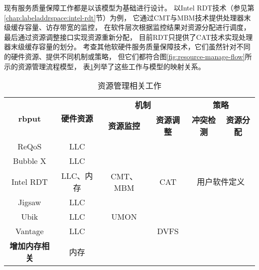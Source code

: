 
现有服务质量保障工作都是以该模型为基础进行设计。
以Intel RDT技术（参见第\ref{chap:labeladdrspace:intel-rdt}节）为例，
它通过CMT与MBM技术提供处理器末级缓存容量、访存带宽的监控，
在软件层次根据监控结果对资源分配进行调度，
最后通过资源调整接口实现资源重新分配，
目前RDT只提供了CAT技术实现处理器末级缓存容量的划分。
考查其他软硬件服务质量保障技术\cite{}，它们虽然针对不同的硬件资源、提供不同机制或策略，
但它们都符合图\ref{fig:resource-manage-flow}所示的资源管理流程模型，
表\ref{tab:resman-compare}列举了这些工作与模型的映射关系。


\begin{table}[htb]
  \centering
  \begin{minipage}[t]{0.95\linewidth}
  \caption{资源管理相关工作}
  \label{tab:resman-compare}
    \begin{tabular*}{\linewidth}{cccccc}
      \toprule[1.5pt]
      \multirow{2}{*}{\textbf{rbput}}     & \multirow{2}{*}{\textbf{硬件资源}} & \multicolumn{2}{c}{\textbf{机制}}     & \multicolumn{2}{c}{\textbf{策略}}     \\
                                          &                                    & \textbf{资源监控} & \textbf{资源调整} & \textbf{冲突检测} & \textbf{资源分配} \\
      \midrule[1pt]
      ReQoS\cite{}                        & LLC                                &                   &                   &                   &                   \\
      Bubble X\cite{}                     & LLC                                &                   &                   &                   &                   \\
      \hline
      Intel RDT\cite{}                    & LLC、内存                          & CMT、MBM          & CAT               & \multicolumn{2}{c}{用户软件定义}      \\
      Jigsaw\cite{Jigsaw:2013}            & LLC                                &                   &                   &                   &                   \\
      Ubik\cite{kasture_ubik:_2014}       & LLC                                & UMON              &                   &                   &                   \\
      Vantage\cite{sanchez_vantage:_2011} & LLC                                &                   & DVFS              &                   &                   \\
      \hline
      \textbf{增加内存相关}\cite{}        & 内存                               &                   &                   &                   &                   \\
      \bottomrule[1.5pt]
    \end{tabular*}\\[2pt]
  \end{minipage}
\end{table}

